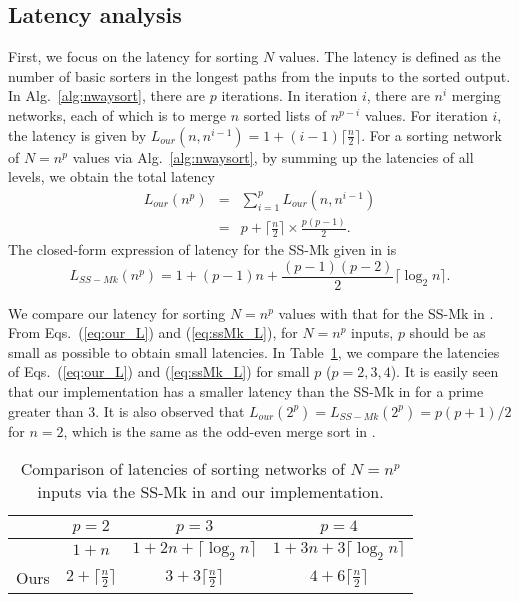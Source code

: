 \documentclass[10pt,journal,cspaper,compsoc]{IEEEtran}
\begin{document}
\subsection{Latency analysis}
First, we focus on the latency for sorting $N$ values. The latency is defined as the number of basic sorters in the longest paths from the inputs to the sorted output. In Alg.~\ref{alg:nwaysort}, there are $p$ iterations. In iteration $i$, there are $n^i$ merging networks, each of which is to merge $n$ sorted lists of $n^{p-i}$ values. For iteration $i$, the latency is given by $L_{our}(n,n^{i-1}) = 1+(i-1)\lceil \frac{n}{2} \rceil$.
For a sorting network of $N=n^p$ values via Alg.~\ref{alg:nwaysort}, by summing up the latencies of all levels, we obtain the total latency
\begin{equation}
\begin{array}{rcl}
L_{our}(n^p) &=& \sum^{p}_{i=1} L_{our}(n,n^{i-1}) \\
&=& p + \lceil \frac{n}{2} \rceil \times \frac{p(p-1)}{2}.
\end{array}
\label{eq:our_L}
\end{equation}
The closed-form expression of latency for the SS-Mk given in \cite{gao1997sloping} is
\begin{equation}
L_{SS-Mk}(n^p) = 1+(p-1)n + \frac{(p-1)(p-2)}{2}\lceil \log_2 n \rceil.
\label{eq:ssMk_L}
\end{equation}

We compare our latency for sorting $N=n^p$ values with that for the SS-Mk in \cite{gao1997sloping}. From Eqs.~(\ref{eq:our_L}) and (\ref{eq:ssMk_L}), for $N=n^p$ inputs, $p$ should be as small as possible to obtain small latencies.
In Table~\ref{tab:latency}, we compare the latencies of Eqs.~(\ref{eq:our_L}) and (\ref{eq:ssMk_L}) for small $p$ ($p=2,3,4$). It is easily seen that our implementation has a smaller latency than the SS-Mk in \cite{gao1997sloping} for a prime greater than 3. It is also observed that $L_{our}(2^p) = L_{SS-Mk}(2^p) = p(p+1)/2$ for $n=2$, which is the same as the odd-even merge sort in \cite{Bat68sorting}.

\begin{table}[!th]
\caption{Comparison of latencies of sorting networks of $N=n^p$ inputs via the SS-Mk in \cite{gao1997sloping} and our implementation.}\label{tab:latency}
\begin{center}
\begin{tabular}{|c|c|c|c|}
\hline
& $p=2$ & $p=3$ & $p=4$ \\
\hline
\cite{gao1997sloping} & $1+n$ & $1+2n + \lceil \log_2 n \rceil$ & $1+3n + 3 \lceil \log_2 n \rceil$ \\
\hline
Ours & $2+\lceil \frac{n}{2} \rceil$ & $3 + 3\lceil \frac{n}{2} \rceil$ & $4+ 6\lceil \frac{n}{2} \rceil$\\
\hline
\end{tabular}
\end{center}
\end{table}
\end{document}
